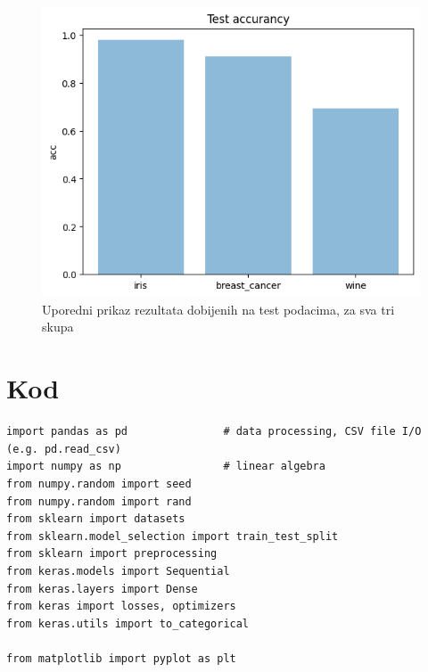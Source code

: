 \documentclass[a4paper]{article}
\begin{document}
\begin{figure}[h!]
\centering
\captionsetup{justification=centering,margin=2cm}
\begin{center}
\includegraphics[scale=0.4]{img/test.png}
\end{center}
\caption{Uporedni prikaz rezultata dobijenih na test podacima, za sva tri skupa}
\label{fig:test_appendix}
\end{figure}

\section{Kod}

\begin{lstlisting}
import pandas as pd               # data processing, CSV file I/O (e.g. pd.read_csv)
import numpy as np                # linear algebra
from numpy.random import seed
from numpy.random import rand
from sklearn import datasets 
from sklearn.model_selection import train_test_split
from sklearn import preprocessing
from keras.models import Sequential
from keras.layers import Dense
from keras import losses, optimizers
from keras.utils import to_categorical

from matplotlib import pyplot as plt

\end{lstlisting}
\end{document}
